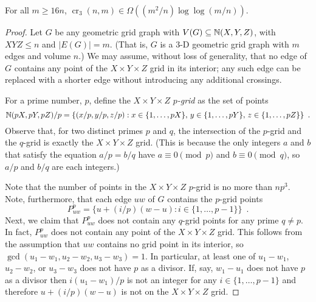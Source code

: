 \documentclass{patmorin}
\DeclareMathOperator{\crs}{cr}
\begin{document}
\begin{thm}
  For all $m\ge 16n$, $\crs_3(n,m) \in \Omega((m^2/n)\log\log (m/n))$.
\end{thm}

\begin{proof}
  Let $G$ be any geometric grid graph with $V(G)\subseteq\mathbb{N}(X,Y,Z)$,
  with $XYZ\le n$ and $|E(G)|=m$. (That is, $G$ is a 3-D geometric grid
  graph with $m$ edges and volume $n$.)  We may assume, without loss of
  generality, that no edge of $G$ contains any point of the $X\times
  Y\times Z$ grid in its interior; any such edge can be replaced with
  a shorter edge without introducing any additional crossings.

  For a prime number, $p$, define the $X\times Y\times Z$ \emph{$p$-grid}
  as the set of points
  \[
    \mathbb{N}(pX,pY,pZ)/p = \{(x/p,y/p,z/p): x\in\{1,\ldots,pX\},\,
    y\in\{1,\ldots,pY\},\, z\in\{1,\ldots,pZ\}\} \enspace .
  \]
  Observe that, for two distinct primes $p$ and $q$, the intersection
  of the $p$-grid and the $q$-grid is exactly the $X\times Y\times Z$
  grid. (This is because the only integers $a$ and $b$ that satisfy the
  equation $a/p = b/q$ have $a\equiv 0 \pmod{p}$ and $b\equiv 0\pmod q$,
  so $a/p$ and $b/q$ are each integers.)

  Note that the number of points in the $X\times Y\times Z$ $p$-grid is
  no more than $np^3$.  Note, furthermore, that each edge $uw$ of $G$
  contains the $p$-grid points
  \[
      P_{uw}^p = \{ u+(i/p)(w-u) : i\in\{1,\ldots,p-1\} \} \enspace .
  \]
  Next, we claim that $P_{uw}^p$ does not contain any $q$-grid points for
  any prime $q\neq p$.  In fact, $P_{uw}^p$ does not contain any point
  of the $X\times Y\times Z$ grid.  This follows from the assumption that
  $uw$ contains no grid point in its interior, so $\gcd(u_1-w_1, u_2-w_2,
  u_3-w_3)=1$.  In particular, at least one of $u_1-w_1$, $u_2-w_2$,
  or $u_3-w_3$ does not have $p$ as a divisor.  If, say, $w_1-u_1$ does
  not have $p$ as a divisor then $i(u_1-w_1)/p$ is not an integer for
  any $i\in\{1,\ldots,p-1\}$ and therefore $u+(i/p)(w-u)$ is not on the
  $X\times Y\times Z$ grid.
  

\end{proof}
\end{document}
